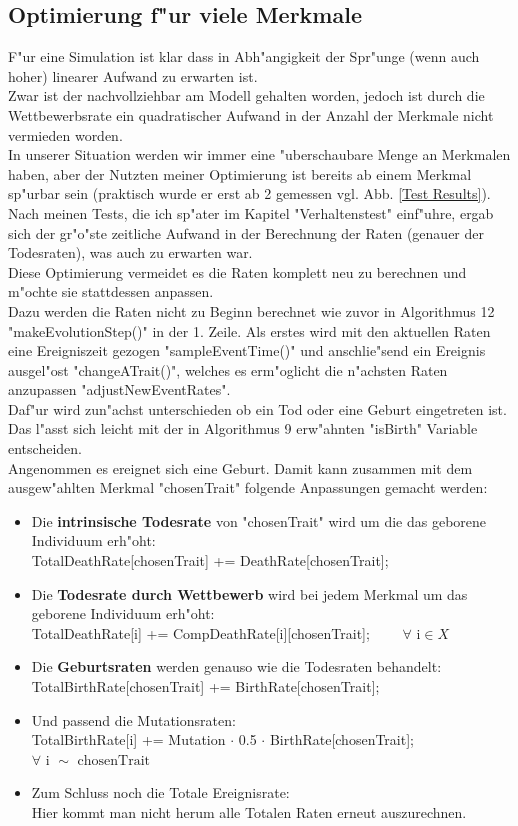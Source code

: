\documentclass[11pt, a4paper, german]{article}
\theoremstyle{plain}
\begin{document}
	\subsection{Optimierung f"ur viele Merkmale}
	F"ur eine Simulation ist klar dass in Abh"angigkeit der Spr"unge (wenn auch hoher) linearer Aufwand zu erwarten ist.\\
	Zwar ist der nachvollziehbar am Modell gehalten worden, jedoch ist durch die Wettbewerbsrate ein quadratischer Aufwand in der Anzahl der Merkmale nicht vermieden worden.\\
	In unserer Situation werden wir immer eine "uberschaubare Menge an Merkmalen haben, aber der Nutzten meiner Optimierung ist bereits ab einem Merkmal sp"urbar sein (praktisch wurde er erst ab 2 gemessen vgl. Abb. \ref{Test Results}).\\
	Nach meinen Tests, die ich sp"ater im Kapitel "{}Verhaltenstest"{} einf"uhre, ergab sich der gr"o"ste zeitliche Aufwand in der Berechnung der Raten (genauer der Todesraten), was auch zu erwarten war.\\
	Diese Optimierung vermeidet es die Raten komplett neu zu berechnen und m"ochte sie stattdessen anpassen. \\
	Dazu werden die Raten nicht zu Beginn berechnet wie zuvor in Algorithmus 12 "{}makeEvolutionStep()"{} in der 1. Zeile. Als erstes wird mit den aktuellen Raten eine Ereigniszeit gezogen "{}sampleEventTime()"{} und anschlie"send ein Ereignis ausgel"ost "{}changeATrait()"{}, welches es erm"oglicht die n"achsten Raten anzupassen "{}adjustNewEventRates"{}.\\
	Daf"ur wird zun"achst unterschieden ob ein Tod oder eine Geburt eingetreten ist. Das l"asst sich leicht mit der in Algorithmus 9 erw"ahnten "{}isBirth"{} Variable entscheiden.\\
	Angenommen es ereignet sich eine Geburt. Damit kann zusammen mit dem ausgew"ahlten Merkmal "{}chosenTrait"{} folgende Anpassungen gemacht werden:
	\begin{itemize}
		\item Die \textbf{intrinsische Todesrate} von "{}chosenTrait"{} wird um die das geborene Individuum erh"oht:\\ 
		TotalDeathRate[chosenTrait] += DeathRate[chosenTrait];
		\item Die \textbf{Todesrate durch Wettbewerb} wird bei jedem Merkmal um das geborene Individuum erh"oht:\\
		TotalDeathRate[i] += CompDeathRate[i][chosenTrait]; $ \qquad \forall \text{ i} \in X $
		\item Die \textbf{Geburtsraten} werden genauso wie die Todesraten behandelt:\\
		TotalBirthRate[chosenTrait] += BirthRate[chosenTrait];
		\item Und passend die Mutationsraten:\\
		TotalBirthRate[i] += Mutation $ \cdot $ 0.5 $ \cdot $ BirthRate[chosenTrait]; \\
		$\forall \text{ i } \sim \text{ chosenTrait} $
		\item Zum Schluss noch die Totale Ereignisrate:\\
		Hier kommt man nicht herum alle Totalen Raten erneut auszurechnen.
	\end{itemize}
\end{document}
